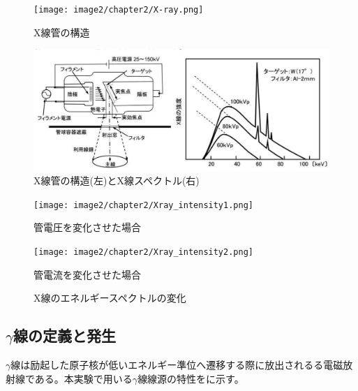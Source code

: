 \begin{figure}[H]
 \begin{center}
 \texttt{[image: image2/chapter2/X-ray.png]} 
 \end{center}
 \caption{X線管の構造\cite{iinuma}}
 \label{fig:Xray}
\end{figure}

\begin{figure}[H]
 \begin{center}
 \includegraphics[width=14cm]{image/other/X-ray.eps}
 \end{center}
 \caption{X線管の構造(左)とX線スペクトル(右)\cite{iinuma}}
 \label{fig:Xray}
\end{figure}
\fi

\begin{figure}[H]
 \begin{minipage}{0.5\hsize}
  \begin{center}
   \texttt{[image: image2/chapter2/Xray\_intensity1.png]} 
  \end{center}
  \vspace{0.cm}
  \caption*{管電圧を変化させた場合}
 \end{minipage}
 \begin{minipage}{0.5\hsize}
  \begin{center}
 \texttt{[image: image2/chapter2/Xray\_intensity2.png]} 
  \end{center}
  \vspace{0cm}
  \caption*{管電流を変化させた場合}
 \end{minipage}
 \begin{center}
  \caption{X線のエネルギースペクトルの変化\cite{ishida}}
  \label{fig:Xray_intensity}
  \end{center}
\end{figure}



%

\subsection{$\gamma$線の定義と発生}
$\gamma$線は励起した原子核が低いエネルギー準位へ遷移する際に放出されるる電磁放射線である。本実験で用いる$\gamma$線線源の特性をに示す。

